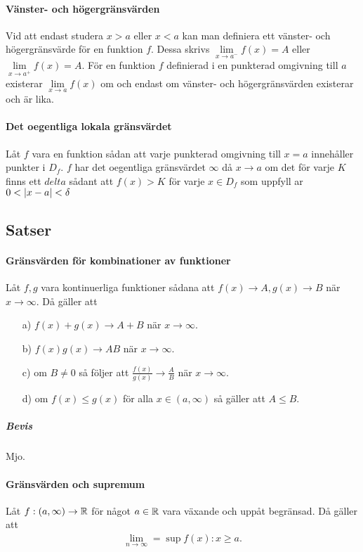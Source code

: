 \paragraph{Vänster- och högergränsvärden}
Vid att endast studera $x > a$ eller $x < a$ kan man definiera ett vänster- och högergränsvärde för en funktion $f$. Dessa skrivs $\lim\limits_{x\to a^-} f(x) = A$ eller $\lim\limits_{x\to a^+} f(x) = A$. För en funktion $f$ definierad i en punkterad omgivning till $a$ existerar $\lim\limits_{x\to a} f(x)$ om och endast om vänster- och högergränsvärden existerar och är lika.

\paragraph{Det oegentliga lokala gränsvärdet}
Låt $f$ vara en funktion sådan att varje punkterad omgivning till  $x = a$ innehåller punkter i $D_f$. $f$ har det oegentliga gränsvärdet $\infty$ då $x\to a$ om det för varje $K$ finns ett $delta$ sådant att $f(x) > K$ för varje $x\in D_f$ som uppfyll	ar $0 < \abs{x - a} < \delta$

\subsection{Satser}

\paragraph{Gränsvärden för kombinationer av funktioner}
Låt $f,g$ vara kontinuerliga funktioner sådana att $f(x)\to A, g(x)\to B$ när $x\to\infty$. Då gäller att
\begin{itemize}
	\item[a)] $f(x) + g(x)\to A + B$ när $x\to\infty$.
	\item[b)] $f(x)g(x)\to AB$ när $x\to\infty$.
	\item[c)] om $B\neq 0$ så följer att $\frac{f(x)}{g(x)}\to\frac{A}{B}$ när $x\to\infty$.
	\item[d)] om $f(x)\leq g(x)$ för alla $x\in (a,\infty)$ så gäller att $A\leq B$.
\end{itemize}

\subparagraph{Bevis}
Mjo.

\paragraph{Gränsvärden och supremum}
Låt $f: (a, \infty)\to\mathbb{R}$ för något $a\in\mathbb{R}$ vara växande och uppåt begränsad. Då gäller att
\begin{align*}
	\lim\limits_{n\to\infty} = \sup{f(x): x\geq a}.
\end{align*}

